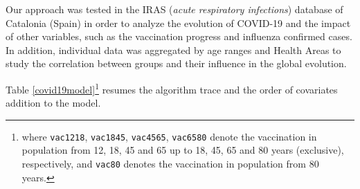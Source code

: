 \documentclass[a4paper]{easychair}
\begin{document}
Our approach was tested in the IRAS (\textit{acute respiratory infections}) database of Catalonia (Spain) in order to analyze the evolution of COVID-19 and the impact of other variables, such as the vaccination progress and influenza confirmed cases. In addition, individual data was aggregated by age ranges and Health Areas to study the correlation between groups and their influence in the global evolution. 

Table \ref{covid19model}\footnote{where \texttt{vac1218}, \texttt{vac1845}, \texttt{vac4565}, \texttt{vac6580} denote the vaccination in population from 12, 18, 45 and 65 up to 18, 45, 65 and 80 years (exclusive), respectively, and \texttt{vac80} denotes the vaccination in population from 80 years.} resumes the algorithm trace and the order of covariates addition to the model.



\end{document}
